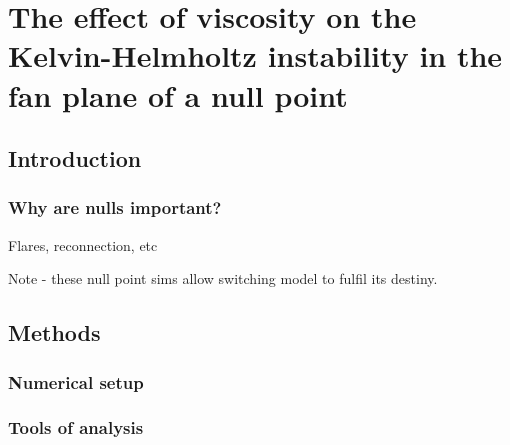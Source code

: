 \chapter{The effect of viscosity on the Kelvin-Helmholtz instability in the fan plane of a null point}

\graphicspath{{images/null_point_khi/}}

\section{Introduction}

\subsection{Why are nulls important?}

Flares, reconnection, etc

Note - these null point sims allow switching model to fulfil its destiny.

\section{Methods}

\subsection{Numerical setup}

\subsection{Tools of analysis}

